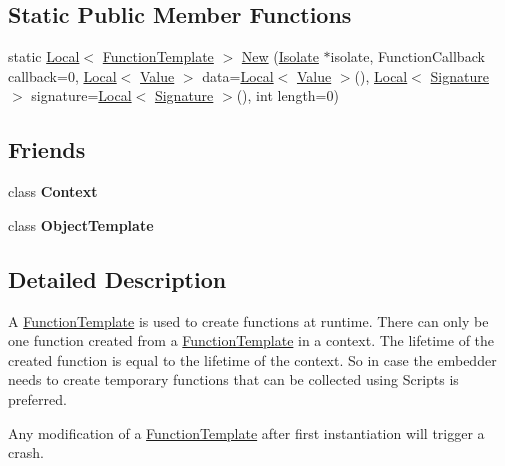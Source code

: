 \subsection*{Static Public Member Functions}
\begin{DoxyCompactItemize}
\item 
static \hyperlink{classv8_1_1Local}{Local}$<$ \hyperlink{classv8_1_1FunctionTemplate}{Function\+Template} $>$ \hyperlink{classv8_1_1FunctionTemplate_a3c6a525ee4e0d72afa77be8e34861f83}{New} (\hyperlink{classv8_1_1Isolate}{Isolate} $\ast$isolate, Function\+Callback callback=0, \hyperlink{classv8_1_1Local}{Local}$<$ \hyperlink{classv8_1_1Value}{Value} $>$ data=\hyperlink{classv8_1_1Local}{Local}$<$ \hyperlink{classv8_1_1Value}{Value} $>$(), \hyperlink{classv8_1_1Local}{Local}$<$ \hyperlink{classv8_1_1Signature}{Signature} $>$ signature=\hyperlink{classv8_1_1Local}{Local}$<$ \hyperlink{classv8_1_1Signature}{Signature} $>$(), int length=0)
\end{DoxyCompactItemize}
\subsection*{Friends}
\begin{DoxyCompactItemize}
\item 
\hypertarget{classv8_1_1FunctionTemplate_ac26c806e60ca4a0547680edb68f6e39b}{}class {\bfseries Context}\label{classv8_1_1FunctionTemplate_ac26c806e60ca4a0547680edb68f6e39b}

\item 
\hypertarget{classv8_1_1FunctionTemplate_a4d28646409234f556983be8a96c06424}{}class {\bfseries Object\+Template}\label{classv8_1_1FunctionTemplate_a4d28646409234f556983be8a96c06424}

\end{DoxyCompactItemize}


\subsection{Detailed Description}
A \hyperlink{classv8_1_1FunctionTemplate}{Function\+Template} is used to create functions at runtime. There can only be one function created from a \hyperlink{classv8_1_1FunctionTemplate}{Function\+Template} in a context. The lifetime of the created function is equal to the lifetime of the context. So in case the embedder needs to create temporary functions that can be collected using Scripts is preferred.

Any modification of a \hyperlink{classv8_1_1FunctionTemplate}{Function\+Template} after first instantiation will trigger a crash.

